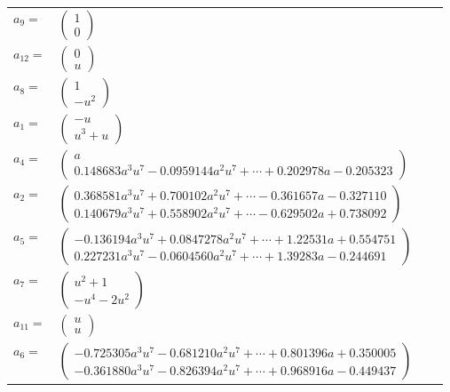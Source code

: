 \documentclass[1p]{elsarticle_modified}
\theoremstyle{definition}
\begin{document}
\begin{tabular}{m{7pt} m{180pt} m{7pt} m{180pt} }
\flushright $a_{9}=$&$\begin{pmatrix}1\\0\end{pmatrix}$ \\
\flushright $a_{12}=$&$\begin{pmatrix}0\\u\end{pmatrix}$ \\
\flushright $a_{8}=$&$\begin{pmatrix}1\\- u^2\end{pmatrix}$ \\
\flushright $a_{1}=$&$\begin{pmatrix}- u\\u^3+u\end{pmatrix}$ \\
\flushright $a_{4}=$&$\begin{pmatrix}a\\0.148683 a^{3} u^{7}-0.0959144 a^{2} u^{7}+\cdots+0.202978 a-0.205323\end{pmatrix}$ \\
\flushright $a_{2}=$&$\begin{pmatrix}0.368581 a^{3} u^{7}+0.700102 a^{2} u^{7}+\cdots-0.361657 a-0.327110\\0.140679 a^{3} u^{7}+0.558902 a^{2} u^{7}+\cdots-0.629502 a+0.738092\end{pmatrix}$ \\
\flushright $a_{5}=$&$\begin{pmatrix}-0.136194 a^{3} u^{7}+0.0847278 a^{2} u^{7}+\cdots+1.22531 a+0.554751\\0.227231 a^{3} u^{7}-0.0604560 a^{2} u^{7}+\cdots+1.39283 a-0.244691\end{pmatrix}$ \\
\flushright $a_{7}=$&$\begin{pmatrix}u^2+1\\- u^4-2 u^2\end{pmatrix}$ \\
\flushright $a_{11}=$&$\begin{pmatrix}u\\u\end{pmatrix}$ \\
\flushright $a_{6}=$&$\begin{pmatrix}-0.725305 a^{3} u^{7}-0.681210 a^{2} u^{7}+\cdots+0.801396 a+0.350005\\-0.361880 a^{3} u^{7}-0.826394 a^{2} u^{7}+\cdots+0.968916 a-0.449437\end{pmatrix}$ \\

\end{tabular}
\end{document}
